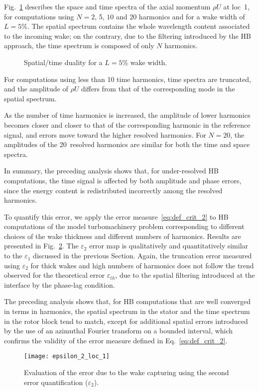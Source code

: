 Fig.~\ref{fig:dualite_crit} describes the space and 
time spectra of the axial momentum $\rho U$ at loc~1, 
for computations using $N=2$, 5, $10$ and $20$ 
harmonics and for a wake width of $L=5\%$.
The spatial spectrum contains the whole wavelength 
content associated to the incoming wake; 
on the contrary, due to the filtering introduced 
by the HB approach, the time spectrum is composed of only $N$ harmonics.
\begin{figure}[htb]
\centering
{}
\caption{Spatial/time duality for a $L=5\%$ wake width.}
\label{fig:dualite_crit}
\end{figure}

For computations using less than 10 time harmonics, 
time spectra are truncated, and the amplitude of 
$\rho U$ differs from that of the corresponding mode in the spatial spectrum.

As the number of time harmonics is increased, 
the amplitude of lower harmonics becomes closer 
and closer to that of the corresponding harmonic 
in the reference signal, and errors move toward 
the higher resolved harmonics. For $N=20$, 
the amplitudes of the 20~resolved harmonics are 
similar for both the time and space spectra.

In summary, the preceding analysis shows that, 
for under-resolved HB computations, the time 
signal is affected by both amplitude and phase errors, 
since the energy content is redistributed incorrectly 
among the resolved harmonics.

To quantify this error, we apply the error measure~\eqref{eq:def_crit_2}
to HB computations of the model turbomachinery 
problem corresponding to different choices 
of the wake thickness and different numbers of 
harmonics. Results are presented in Fig.~\ref{fig:crit_2_3d}.
The $\varepsilon_2$ error map is qualitatively 
and quantitatively similar to the $\varepsilon_1$ 
discussed in the previous Section. 
Again, the truncation error measured using $\varepsilon_2$ 
for thick wakes and high numbers of harmonics 
does not follow the trend observed for the 
theoretical error $\varepsilon_{th}$, 
due to the spatial filtering introduced at the 
interface by the phase-lag condition.

The preceding analysis shows that, for HB computations 
that are well converged in terms in harmonics, 
the spatial spectrum in the stator and the 
time spectrum in the rotor block tend to match, 
except for additional spatial errors introduced
by the use of an azimuthal Fourier transform on a 
bounded interval, which confirms the 
validity of the error measure defined in Eq.~\eqref{eq:def_crit_2}.
\begin{figure}[htb]
   \centering \texttt{[image: epsilon\_2\_loc\_1]}
  \caption{Evaluation of the error due to the wake 
  capturing using the second error quantification ($\varepsilon_2$).}
  \label{fig:crit_2_3d}
\end{figure}

